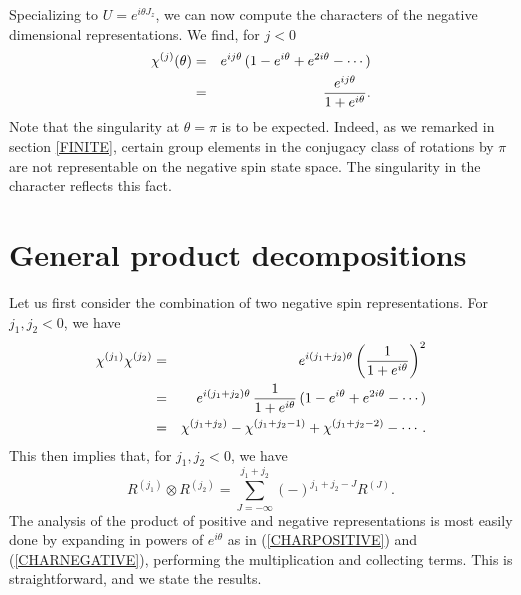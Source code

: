 \documentclass[a4paper,dvips,12pt]{article}
\begin{document}
    Specializing to $U = e^{i\theta J_z}$, we can now compute the
    characters of the negative dimensional representations.  We
    find, for $j < 0$
    \begin{eqnarray}
        \chi^{(j)}(\theta) &=&  e^{ij\theta} \,
           (1 - e^{i\theta} + e^{2i\theta} - \cdots) \nonumber\\
           &=& {e^{ij\theta}\over 1 + e^{i\theta}}.
            \label{CHARNEGATIVE}
    \end{eqnarray}
    Note that the singularity at $\theta = \pi$ is to be expected.  Indeed,
    as we remarked in section \ref{FINITE}, certain group elements in the conjugacy
    class of rotations by $\pi$ are not representable on the negative spin
    state space.  The singularity in
    the character reflects this fact.


    \section{General product decompositions}

    Let us first consider the combination of two negative spin
    representations.  For $j_1, j_2 < 0$, we have
    \begin{eqnarray}
        \chi^{(j_1)} \chi^{(j_2)} &=& e^{i(j_1 + j_2)\theta}
            \left({1\over 1 + e^{i\theta}}\right)^2\nonumber\\
            &=& e^{i(j_1 + j_2)\theta}
            \, {1\over 1 + e^{i\theta}} \,(1 - e^{i\theta} + e^{2i\theta} - \cdots)
               \nonumber\\
            &=& \chi^{(j_1 + j_2)} - \chi^{(j_1 + j_2 - 1)}
                    + \chi^{(j_1 + j_2 - 2)} - \cdots.
    \end{eqnarray}
    This then implies that, for $j_1, j_2 < 0$, we have
    \begin{equation}
        R^{(j_1)}\otimes R^{(j_2)} = \sum_{J = -\infty}^{j_1 + j_2}
        (-)^{j_1 + j_2 - J} R^{(J)}.
    \end{equation}
    The analysis of the product of positive and negative
    representations is most easily done by expanding in
    powers of $e^{i\theta}$ as in (\ref{CHARPOSITIVE}) and
    (\ref{CHARNEGATIVE}), performing the multiplication and
    collecting terms.  This is straightforward, and we state the
    results.
\end{document}
